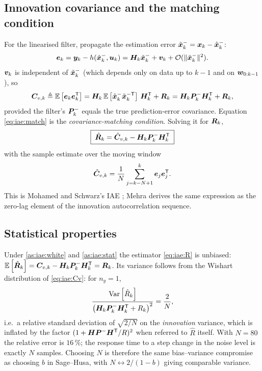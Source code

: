 \subsection{Innovation covariance and the matching condition}
For the linearised filter, propagate the estimation error $\tilde{\bm{x}}^-_k = \bm{x}_k - \hat{\bm{x}}^{-}_k$:
\begin{equation}
\bm{e}_k = \bm{y}_k - h(\hat{\bm{x}}^{-}_k,\bm{u}_k) = \bm{H}_k\tilde{\bm{x}}^-_k + \bm{v}_k + \mathcal{O}(\|\tilde{\bm{x}}^-_k\|^2).
\label{eq:iae:elin}
\end{equation}
$\bm{v}_k$ is independent of $\tilde{\bm{x}}^-_k$ (which depends only on data up to $k-1$ and on
$\bm{w}_{0:k-1}$), so
\begin{equation}
\bm{C}_{v,k} \triangleq \mathbb{E}\left[\bm{e}_k\bm{e}_k^{\mathsf{T}}\right] = \bm{H}_k\,\mathbb{E}\left[\tilde{\bm{x}}^-_k\tilde{\bm{x}}^{-\mathsf{T}}_k\right]\,\bm{H}_k^{\mathsf{T}} + \bm{R}_k
= \bm{H}_k\bm{P}^{-}_k\bm{H}_k^{\mathsf{T}} + \bm{R}_k ,
\label{eq:iae:match}
\end{equation}
provided the filter's $\bm{P}^{-}_k$ equals the true prediction-error covariance.  Equation
\eqref{eq:iae:match} is the \emph{covariance-matching condition}.  Solving it for $\bm{R}_k$,
\begin{equation}
\boxed{\;\hat{\bm{R}}_k = \hat{\bm{C}}_{v,k} - \bm{H}_k\bm{P}^{-}_k\bm{H}_k^{\mathsf{T}}\;}
\label{eq:iae:R}
\end{equation}
with the sample estimate over the moving window
\begin{equation}
\hat{\bm{C}}_{v,k} = \frac{1}{N}\sum_{j=k-N+1}^{k} \bm{e}_j\bm{e}_j^{\mathsf{T}} .
\label{eq:iae:Cv}
\end{equation}
This is Mohamed and Schwarz's IAE \cite[Eq.~(16)]{mohamed1999adaptive}; Mehra
\cite[Sec.~III]{mehra1970} derives the same expression as the zero-lag element of the innovation
autocorrelation sequence.

\subsection{Statistical properties}
Under \cref{as:iae:white} and \cref{as:iae:stat} the estimator \eqref{eq:iae:R} is unbiased:
$\mathbb{E}\left[\hat{\bm{R}}_k\right] = \bm{C}_{v,k} - \bm{H}_k\bm{P}^{-}_k\bm{H}_k^{\mathsf{T}} = \bm{R}_k$.  Its variance follows from the
Wishart distribution of \eqref{eq:iae:Cv}: for $n_y=1$,
\begin{equation}
\frac{\operatorname{Var}\left[\hat{R}_k\right]}{\big(\bm{H}_k\bm{P}^{-}_k\bm{H}_k^{\mathsf{T}}+R_k\big)^2} = \frac{2}{N},
\label{eq:iae:var}
\end{equation}
i.e.\ a relative standard deviation of $\sqrt{2/N}$ on the \emph{innovation} variance, which is
inflated by the factor $(1 + \bm{H}\bm{P}^{-}\bm{H}^{\mathsf{T}}/R)^2$ when referred to $\hat R$ itself.  With $N=80$
the relative error is $16\,\%$; the response time to a step change in the noise level is exactly
$N$ samples.  Choosing $N$ is therefore the same bias--variance compromise as choosing $b$ in
Sage--Husa, with $N \leftrightarrow 2/(1-b)$ giving comparable variance.

